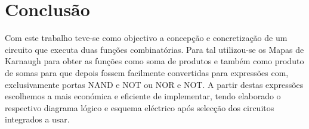 \documentclass[a4paper,12pt]{article}
\begin{document}
\section{Conclusão}
Com este trabalho teve-se como objectivo a concepção e concretização de um
circuito que executa duas funções combinatórias. Para tal utilizou-se os Mapas
de Karnaugh para obter as funções como soma de produtos e também como produto de
somas para que depois fossem facilmente convertidas para expressões com, 
exclusivamente portas NAND e NOT ou NOR e NOT. A partir destas expressões 
escolhemos a mais económica e eficiente de implementar, tendo elaborado o 
respectivo diagrama lógico e esquema eléctrico após selecção dos circuitos 
integrados a usar.
\end{document}
